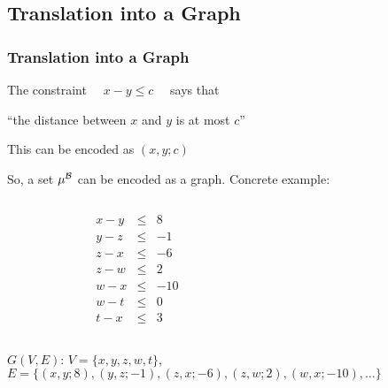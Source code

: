 \subsection{Translation into a Graph}

\begin{frame}
  \frametitle{Translation into a Graph}

  \scriptsize

  The constraint $\quad x - y \leq c \quad$ says that 
  
  \begin{center}
    ``the distance between $x$ and $y$ is at most $c$''
  \end{center}

  This can be encoded as $(x,y;c)$

  \begin{center}
    
  \end{center}

  \pause
  \vfill
  So, a set $\mu^{\mathcal{B}}$ can be encoded as a graph. Concrete example:

  \begin{columns}

    \begin{column}{.3\textwidth}
      $$
      \begin{array}{rcr}
	x - y & \leq & 8   \\
	y - z & \leq & -1  \\
	z - x & \leq & -6  \\
	z - w & \leq & 2   \\
	w - x & \leq & -10 \\
	w - t & \leq & 0   \\
	t - x & \leq & 3     
      \end{array}
      $$
    \end{column}

    \begin{column}{.6\textwidth}
      \begin{center}
	
      \end{center}
    \end{column}

  \end{columns}
  \vfill
  $G( V, E )$: $V = \{ x, y, z, w, t \}$, $E = \{ (x,y;8), (y,z;-1), (z,x;-6), (z,w;2), (w,x;-10), \ldots \}$ 

\end{frame}

